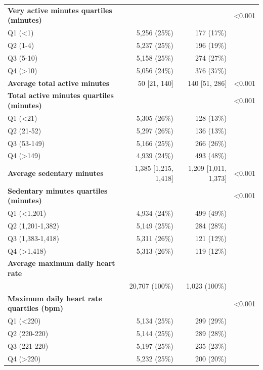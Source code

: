 \documentclass[11pt]{article}
\begin{document}
\begin{longtable}{@{}p{6.4cm}rrr@{}}
\textbf{Very active minutes quartiles (minutes)} &  &  & <0.001 \\
\quad Q1 (<1) & 5,256 (25\%) & 177 (17\%) &  \\
\quad Q2 (1-4) & 5,237 (25\%) & 196 (19\%) &  \\
\quad Q3 (5-10) & 5,158 (25\%) & 274 (27\%) &  \\
\quad Q4 (>10) & 5,056 (24\%) & 376 (37\%) &  \\
\textbf{Average total active minutes} & 50 [21, 140] & 140 [51, 286] & <0.001 \\
\textbf{Total active minutes quartiles (minutes)} &  &  & <0.001 \\
\quad Q1 (<21) & 5,305 (26\%) & 128 (13\%) &  \\
\quad Q2 (21-52) & 5,297 (26\%) & 136 (13\%) &  \\
\quad Q3 (53-149) & 5,166 (25\%) & 266 (26\%) &  \\
\quad Q4 (>149) & 4,939 (24\%) & 493 (48\%) &  \\
\textbf{Average sedentary minutes} & 1,385 [1,215, 1,418] & 1,209 [1,011, 1,373] & <0.001 \\
\textbf{Sedentary minutes quartiles (minutes)} &  &  & <0.001 \\
\quad Q1 (<1,201) & 4,934 (24\%) & 499 (49\%) &  \\
\quad Q2 (1,201-1,382) & 5,149 (25\%) & 284 (28\%) &  \\
\quad Q3 (1,383-1,418) & 5,311 (26\%) & 121 (12\%) &  \\
\quad Q4 (>1,418) & 5,313 (26\%) & 119 (12\%) &  \\
\textbf{Average maximum daily heart rate} &  &  &  \\
\quad 220 & 20,707 (100\%) & 1,023 (100\%) &  \\
\textbf{Maximum daily heart rate quartiles (bpm)} &  &  & <0.001 \\
\quad Q1 (<220) & 5,134 (25\%) & 299 (29\%) &  \\
\quad Q2 (220-220) & 5,144 (25\%) & 289 (28\%) &  \\
\quad Q3 (221-220) & 5,197 (25\%) & 235 (23\%) &  \\
\quad Q4 (>220) & 5,232 (25\%) & 200 (20\%) &  \\
\bottomrule \end{longtable}\normalsize
\end{document}
